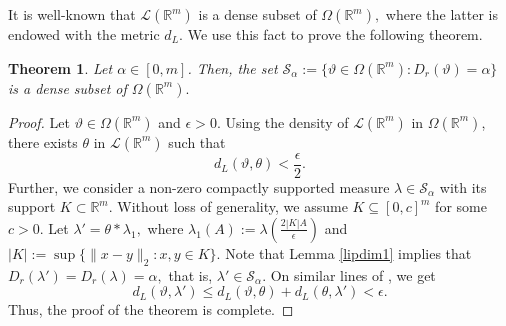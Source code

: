 \documentclass{amsproc}
\newtheorem{theorem}{Theorem}[section]
\theoremstyle{definition}
\theoremstyle{remark}
\numberwithin{equation}{section}
\newcommand{\te}{\text}%
\begin{document}
  It is well-known \cite{Bill} that $\mathcal{L}(\mathbb{R}^m)$ is a dense subset of $\Omega(\mathbb{R}^m),$ where the latter is endowed with the metric $d_L.$ We use this fact to prove the following theorem.
\begin{theorem}\label{densethm}
Let $ \alpha \in [0,m]$. Then, the set  $\mathcal{S}_{\alpha}:=\{ \vartheta \in  \Omega(\mathbb{R}^m): D_r(\vartheta)  = \alpha\}$ is a dense subset of $\Omega(\mathbb{R}^m).$
\end{theorem}
\begin{proof}
    Let $ \vartheta \in \Omega(\mathbb{R}^m)$ and $\epsilon>0.$ Using the density of $\mathcal{L}(\mathbb{R}^m)$ in $\Omega(\mathbb{R}^m)$, there exists $\theta$ in $\mathcal{L}(\mathbb{R}^m)$ such that $$ d_L(\vartheta, \theta) < \frac{\epsilon}{2}.$$ Further, we consider a non-zero compactly supported measure $ \lambda \in \mathcal{S}_{\alpha}$ with its support $K \subset \mathbb{R}^m.$ Without loss of generality, we assume $K \subseteq [0,c]^m$ for some $c>0.$ Let $\lambda'= \theta * \lambda_1,$ where $\lambda_1(A):=\lambda(\frac{2|K| A}{\epsilon})$ and $|K|:=\sup\{\|x-y\|_2: x,y \in K\}.$ Note that Lemma \ref{lipdim1} implies that $D_r(\lambda')=D_r(\lambda)=\alpha,$ that is, $\lambda' \in \mathcal{S}_{\alpha}.$ On similar lines of \cite[Theorem 3.19]{VAM}, we get
      $$ d_L(\vartheta,\lambda') \le  d_L(\vartheta,\theta) + d_L(\theta,\lambda') < \epsilon .$$ 
             Thus, the proof of the theorem is complete.
\end{proof}   
\end{document}
